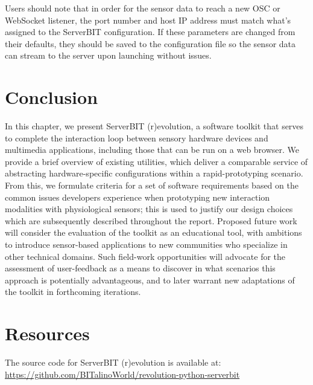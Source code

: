 Users should note that in order for the sensor data to reach a new OSC or WebSocket listener, the port number and host IP address must match what's assigned to the ServerBIT configuration. If these parameters are changed from their defaults, they should be saved to the configuration file so the sensor data can stream to the server upon launching without issues.

\section{Conclusion}

In this chapter, we present ServerBIT (r)evolution, a software toolkit that serves to complete the interaction loop between sensory hardware devices and multimedia applications, including those that can be run on a web browser. We provide a brief overview of existing utilities, which deliver a comparable service of abstracting hardware-specific configurations within a rapid-prototyping scenario. From this, we formulate criteria for a set of software requirements based on the common issues developers experience when prototyping new interaction modalities with physiological sensors; this is used to justify our design choices which are subsequently described throughout the report.
Proposed future work will consider the evaluation of the toolkit as an educational tool, with ambitions to introduce sensor-based applications to new communities who specialize in other technical domains. Such field-work opportunities will advocate for the assessment of user-feedback as a means to discover in what scenarios this approach is potentially advantageous, and to later warrant new adaptations of the toolkit in forthcoming iterations.

\section{Resources}
The source code for ServerBIT (r)evolution is available at:
\url{https://github.com/BITalinoWorld/revolution-python-serverbit}
